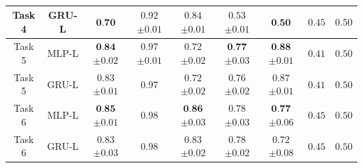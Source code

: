 \begin{table}[htb!]
{\begin{tabular}{ccccccccc}
			Task 4 & GRU-L & $\textbf{0.70}$ & $0.92 $ {\tiny $\pm 0.01$} & $0.84 $ {\tiny $\pm 0.01$} & $0.53 $ {\tiny $\pm 0.01$} & $\textbf{0.50}$ & $0.45$ & $0.50$\\
			\midrule
			Task 5 & MLP-L & $\textbf{0.84} $ {\tiny $\pm 0.02$} & $0.97 $ {\tiny $\pm 0.01$} & $0.72 $ {\tiny $\pm 0.02$} & $\textbf{0.77} $ {\tiny $\pm 0.03$} & $\textbf{0.88} $ {\tiny $\pm 0.01$} & $0.41$ & $0.50$\\
			Task 5 & GRU-L & $0.83 $ {\tiny $\pm 0.01$} & $0.97$ & $0.72 $ {\tiny $\pm 0.02$} & $0.76 $ {\tiny $\pm 0.02$} & $0.87 $ {\tiny $\pm 0.01$} & $0.41$ & $0.50$\\
			\midrule
			Task 6 & MLP-L & $\textbf{0.85} $ {\tiny $\pm 0.01$} & $0.98$ & $\textbf{0.86} $ {\tiny $\pm 0.03$} & $0.78 $ {\tiny $\pm 0.03$} & $\textbf{0.77} $ {\tiny $\pm 0.06$} & $0.45$ & $0.50$\\
			Task 6 & GRU-L & $0.83 $ {\tiny $\pm 0.03$} & $0.98$ & $0.83 $ {\tiny $\pm 0.02$} & $0.78 $ {\tiny $\pm 0.02$} & $0.72 $ {\tiny $\pm 0.08$} & $0.45$ & $0.50$\\
			
			\bottomrule
		\end{tabular}
	}
	\caption{}
	\label{tab:neural-only}
\end{table}

